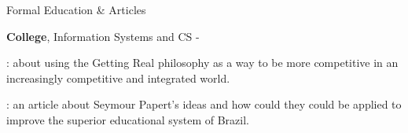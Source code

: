 \begin{rubric}{Formal Education \& Articles}

    \entry*[2002 -- 2007] \textbf{College}, Information Systems and CS -

    \entry*
    \textbf{}: about using
    the Getting Real philosophy as a way to be more competitive in an
    increasingly competitive and integrated world. 

    \entry*
    \textbf{}: an article
    about Seymour Papert's ideas and how could they could be applied to improve
    the superior educational system of Brazil. 

\end{rubric}
